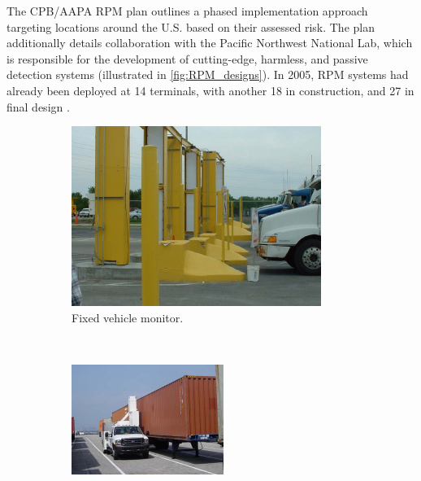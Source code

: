 \documentclass{report}
\begin{document}
The CPB/AAPA RPM plan outlines a phased implementation approach targeting locations around the U.S. based on their assessed risk. The plan additionally details collaboration with the Pacific Northwest National Lab, which is responsible for the development of cutting-edge, harmless, and passive detection systems (illustrated in \autoref{fig:RPM_designs}). In 2005, RPM systems had already been deployed at 14 terminals, with another 18 in construction, and 27 in final design \cite{Simmons2005}.


\begin{figure}
        \centering
        \begin{subfigure}[b]{0.3\textwidth}
                \includegraphics[width=\textwidth,scale=1]{./figures/fixed_vehicle.png}
                \caption{Fixed  vehicle monitor.}
                \label{fig:fixed_vehicle}
        \end{subfigure}%
        ~ %
        \begin{subfigure}[b]{0.3\textwidth}
                \includegraphics[width=\textwidth,scale=1]{./figures/mobile_cargo.png}

\end{subfigure}
\end{figure}
\end{document}
